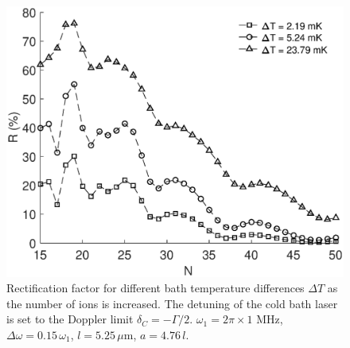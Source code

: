 \begin{figure}
  \center
  \includegraphics[width=0.85\linewidth]{Figures/Changing_N.eps}
  \caption{Rectification factor for different bath temperature differences $\Delta T$ as the number of ions is increased. The detuning of the cold bath laser is set to the Doppler limit $\delta_C = - \Gamma / 2$. $\omega_1 = 2 \pi \times 1$ MHz, $\Delta \omega = 0.15 \, \omega_1$, $l = 5.25\,\mu$m, $a = 4.76 \, l$.}
  \label{fig:N_Dependence}
\end{figure}
%
%
